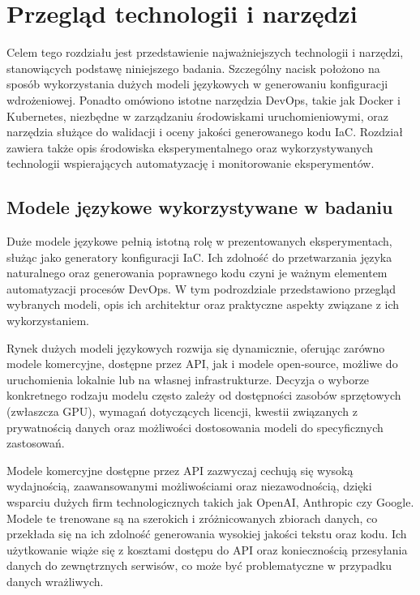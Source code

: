 \clearpage %

\section{Przegląd technologii i narzędzi}

Celem tego rozdziału jest przedstawienie najważniejszych technologii i narzędzi, stanowiących podstawę niniejszego badania. Szczególny nacisk położono na sposób wykorzystania dużych modeli językowych w generowaniu konfiguracji wdrożeniowej. Ponadto omówiono istotne narzędzia DevOps, takie jak Docker i Kubernetes, niezbędne w zarządzaniu środowiskami uruchomieniowymi, oraz narzędzia służące do walidacji i oceny jakości generowanego kodu IaC. Rozdział zawiera także opis środowiska eksperymentalnego oraz wykorzystywanych technologii wspierających automatyzację i monitorowanie eksperymentów.

\subsection{Modele językowe wykorzystywane w badaniu}

Duże modele językowe pełnią istotną rolę w prezentowanych eksperymentach, służąc jako generatory konfiguracji IaC. Ich zdolność do przetwarzania języka naturalnego oraz generowania poprawnego kodu czyni je ważnym elementem automatyzacji procesów DevOps. W tym podrozdziale przedstawiono przegląd wybranych modeli, opis ich architektur oraz praktyczne aspekty związane z ich wykorzystaniem.

Rynek dużych modeli językowych rozwija się dynamicznie, oferując zarówno modele komercyjne, dostępne przez API, jak i modele open-source, możliwe do uruchomienia lokalnie lub na własnej infrastrukturze. Decyzja o wyborze konkretnego rodzaju modelu często zależy od dostępności zasobów sprzętowych (zwłaszcza GPU), wymagań dotyczących licencji, kwestii związanych z prywatnością danych oraz możliwości dostosowania modeli do specyficznych zastosowań.

Modele komercyjne dostępne przez API zazwyczaj cechują się wysoką wydajnością, zaawansowanymi możliwościami oraz niezawodnością, dzięki wsparciu dużych firm technologicznych takich jak OpenAI, Anthropic czy Google. Modele te trenowane są na szerokich i zróżnicowanych zbiorach danych, co przekłada się na ich zdolność generowania wysokiej jakości tekstu oraz kodu. Ich użytkowanie wiąże się z kosztami dostępu do API oraz koniecznością przesyłania danych do zewnętrznych serwisów, co może być problematyczne w przypadku danych wrażliwych.

